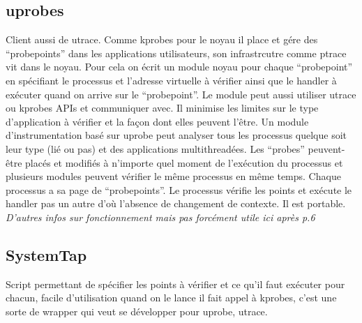 \documentclass{article}
\begin{document}
\subsection{uprobes}
Client aussi de utrace. Comme kprobes pour le noyau il place et gére des
``probepoints'' dans les applications utilisateurs, son infrastrcutre comme
ptrace vit dans le noyau. Pour cela on écrit un module noyau pour chaque
``probepoint'' en spécifiant le processus et l'adresse virtuelle à vérifier
ainsi que le handler à exécuter quand on arrive sur le ``probepoint''. Le module
peut aussi utiliser utrace ou kprobes APIs et communiquer avec. Il minimise les
limites sur le type d'application à vérifier et la façon dont elles peuvent
l'être. Un module d'instrumentation basé sur uprobe peut analyser tous les
processus quelque soit leur type (lié ou pas) et des applications
multithreadées. Les ``probes'' peuvent-être placés et modifiés à n'importe quel
moment de l'exécution du processus et plusieurs modules peuvent vérifier le même
processus en même temps. Chaque processus a sa page de ``probepoints''. Le
processus vérifie les points et exécute le handler pas un autre d'où l'absence
de changement de contexte. Il est portable. \textit{D'autres infos sur
  fonctionnement mais pas forcément utile ici après p.6}

\subsection{SystemTap}
Script permettant de spécifier les points à vérifier et ce qu'il faut exécuter
pour chacun, facile d'utilisation quand on le lance il fait appel à kprobes,
c'est une sorte de wrapper qui veut se développer pour uprobe, utrace.
\end{document}
